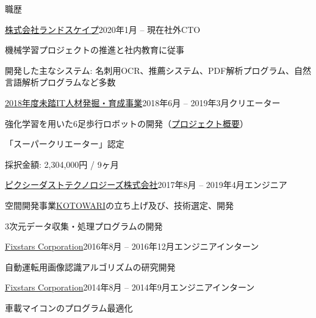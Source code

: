 \documentclass{resume} %
\begin{document}
\begin{rSection}{職歴}

    \begin{rSubsection}{\href{https://www.landscape.co.jp/}{株式会社ランドスケイプ}}{2020年1月 -- 現在}{社外CTO}{}
    \item 機械学習プロジェクトの推進と社内教育に従事
    \item 開発した主なシステム: 名刺用OCR、推薦システム、PDF解析プログラム、自然言語解析プログラムなど多数
    \end{rSubsection}

    \begin{rSubsection}{\href{https://www.mitou.org/}{2018年度未踏IT人材発掘・育成事業}}{2018年6月 -- 2019年3月}{クリエーター}{}
    \item 強化学習を用いた6足歩行ロボットの開発（\href{https://www.ipa.go.jp/jinzai/mitou/2018/gaiyou_tn-1}{プロジェクト概要}）
    \item 「スーパークリエーター」認定
    \item 採択金額: 2,304,000円 / 9ヶ月
    \end{rSubsection}

    \begin{rSubsection}{\href{http://pixiedusttech.com/}{ピクシーダストテクノロジーズ株式会社}}{2017年8月 -- 2019年4月}{エンジニア}{}
    \item 空間開発事業\href{https://pixiedusttech.com/kotowari/}{KOTOWARI}の立ち上げ及び、技術選定、開発
    \item 3次元データ収集・処理プログラムの開発
    \end{rSubsection}

    \begin{rSubsection}{\href{https://www.fixstars.com/en/}{Fixstars Corporation}}{2016年8月 -- 2016年12月}{エンジニアインターン}{}
    \item 自動運転用画像認識アルゴリズムの研究開発
    \end{rSubsection}

    \begin{rSubsection}{\href{https://www.fixstars.com/en/}{Fixstars Corporation}}{2014年8月 -- 2014年9月}{エンジニアインターン}{}
    \item 車載マイコンのプログラム最適化
    \end{rSubsection}

\end{rSection}
\end{document}
